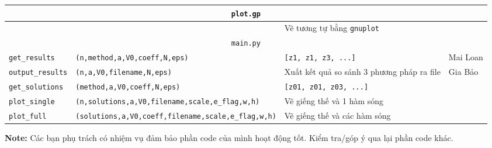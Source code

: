 \documentclass{article}
\begin{document}
\begin{table}[H]
\begin{tabularx}{\linewidth}{|l|l|X|p{3cm}|}
      \hline
      \multicolumn{4}{|c|}{\texttt{plot.gp}} \\
      \hline
               & & Vẽ tương tự bằng \texttt{gnuplot} & \\

      \hline
      \multicolumn{4}{|c|}{\texttt{main.py}} \\
      \hline
      \texttt{get\_results} & %
      \texttt{(n,method,a,V0,coeff,N,eps)} & %
      \texttt{[z1, z1, z3, ...]} & %
      Mai Loan \\

      \texttt{output\_results} & %
      \texttt{(n,a,V0,filename,N,eps)} & %
      Xuất kết quả so sánh 3 phương pháp ra file & %
      Gia Bảo \\

      \texttt{get\_solutions} & %
      \texttt{(method,a,V0,coeff,N,eps)} & %
      \texttt{[z01, z01, z03, ...]} & %
      \\

      \texttt{plot\_single} & %
      \texttt{(n,solutions,a,V0,filename,scale,e\_flag,w,h)} & %
      Vẽ giếng thế và 1 hàm sóng & %
      \\

      \texttt{plot\_full} & %
      \texttt{(solutions,a,V0,coeff,filename,scale,e\_flag,w,h)} & %
      Vẽ giếng thế và các hàm sóng & %
      \\
      \hline
    \end{tabularx}
\end{table}
\textbf{Note:} Các bạn phụ trách có nhiệm vụ đảm bảo phần code của mình hoạt động tốt. Kiểm tra/góp ý qua lại phần code khác.



\end{document}
